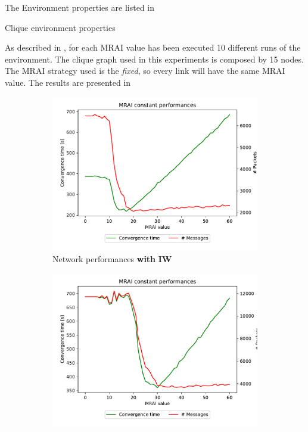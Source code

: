 The Environment properties are listed in 

\begin{table}[h]
	
	\caption{Clique environment properties}
	\label{tbl:clique_properties}
\end{table}

As described in , for each \ac{MRAI} value has been
executed \num{10} different runs of the environment.
The clique graph used in this experiments is composed by \num{15} nodes.
The \ac{MRAI} strategy used is the \textit{fixed}, so every link will have the
same \ac{MRAI} value.
The results are presented in 

\begin{figure}[h]
     \centering
     \begin{subfigure}[b]{0.45\textwidth}
         \centering
         \includegraphics[width=\textwidth]{images/clique/messagesVStime/pareto-clique-constant_mrai_evolution.pdf}
		 \caption{Network performances \textbf{with} \textbf{\ac{IW}}}
         \label{fig:clique_evolution_IW}
     \end{subfigure}
     \hfill
     \begin{subfigure}[b]{0.45\textwidth}
         \centering
         \includegraphics[width=\textwidth]{images/clique/messagesVStime/pareto-clique-noIW-constant_mrai_evolution.pdf}

\end{subfigure}
\end{figure}
